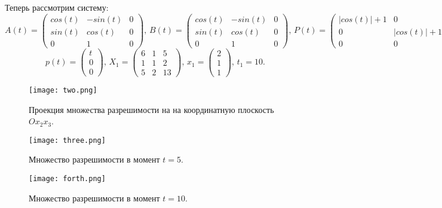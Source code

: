\documentclass[16pt]{article}
\begin{document}
\newpage
Теперь рассмотрим систему:
$$
A(t) = 
\begin{pmatrix}
  cos(t)& -sin(t)& 0\\
  sin(t)& cos(t)& 0\\
  0& 1& 0
\end{pmatrix}, \,
B(t) = 
\begin{pmatrix}
  cos(t)& -sin(t)& 0\\
  sin(t)& cos(t)& 0\\
  0& 1& 0
\end{pmatrix}, \,
P(t) = 
\begin{pmatrix}
  |cos(t)|+1& 0& 0\\
  0& |cos(t)|+1& 0\\
  0& 0& 1
\end{pmatrix},
$$
$$
p(t) = 
\begin{pmatrix}
  t\\
  0\\
  0
\end{pmatrix}, \,
X_1 = 
\begin{pmatrix}
  6& 1& 5\\
  1& 1& 2\\
  5& 2& 13
\end{pmatrix}, \,
x_1 = 
\begin{pmatrix}
  2\\
  1\\
  1
\end{pmatrix}, \,
t_1 = 10.
$$
\begin{figure}[h]
	\center
    \texttt{[image: two.png]}
    \caption{Проекция множества разрешимости на на координатную плоскость $Ox_2x_3$.}
\end{figure}

\begin{figure}
	\center
    \texttt{[image: three.png]}
    \caption{Множество разрешимости в момент $t = 5$.}
\end{figure}
\begin{figure}
	\center
    \texttt{[image: forth.png]}
    \caption{Множество разрешимости в момент $t = 10$.}
\end{figure}
\end{document}
